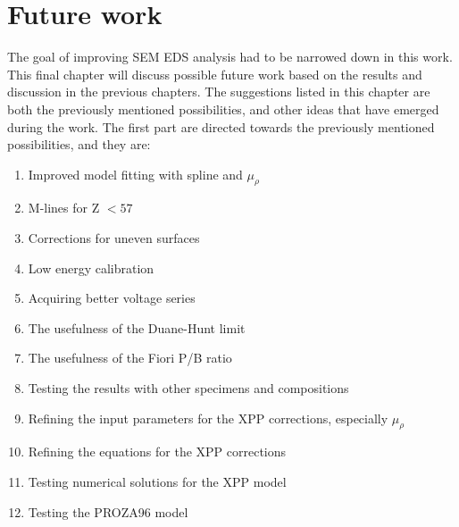 \chapter{Future work}
\label{ch:future_work}


The goal of improving SEM EDS analysis had to be narrowed down in this work.
This final chapter will discuss possible future work based on the results and discussion in the previous chapters.
The suggestions listed in this chapter are both the previously mentioned possibilities, and other ideas that have emerged during the work.
The first part are directed towards the previously mentioned possibilities, and they are:
\begin{enumerate}
    \item Improved model fitting with spline and $\mu_\rho$
    \item M-lines for Z $ < 57$
    \item Corrections for uneven surfaces
    \item Low energy calibration
    \item Acquiring better voltage series
    \item The usefulness of the Duane-Hunt limit
    \item The usefulness of the Fiori P/B ratio
    \item Testing the results with other specimens and compositions
    \item Refining the input parameters for the XPP corrections, especially $\mu_\rho$
    \item Refining the equations for the XPP corrections
    \item Testing numerical solutions for the XPP model
    \item Testing the PROZA96 model
\end{enumerate}



